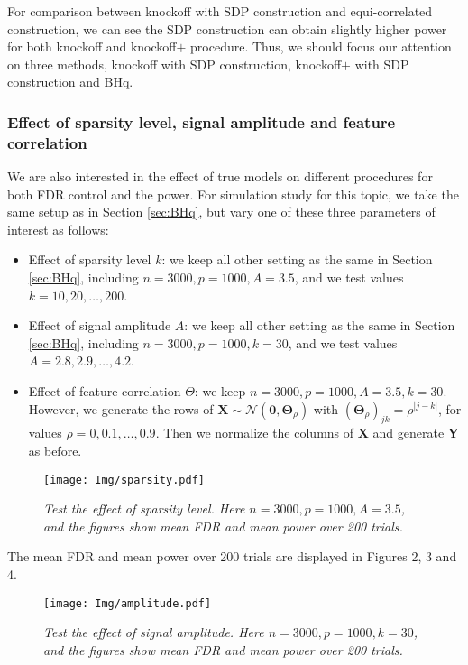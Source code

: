 \documentclass{uwstat572}
\begin{document}
For comparison between knockoff with SDP construction and equi-correlated construction, we can see the SDP construction can obtain slightly higher power for both knockoff and knockoff$+$ procedure. Thus, we should focus our attention on three methods, knockoff with SDP construction, knockoff$+$ with SDP construction and BHq.

\subsubsection{Effect of sparsity level, signal amplitude and feature correlation}\label{sec:effect}
We are also interested in the effect of true models on different procedures for both FDR control and the power. For simulation study for this topic, we take the same setup as in Section \ref{sec:BHq}, but vary one of these three parameters of interest as follows:
\begin{itemize}
\item Effect of sparsity level $k$: we keep all other setting as the same in Section \ref{sec:BHq}, including $n=3000, p=1000, A=3.5$, and we test values $k=10,20,\dots, 200$.
\item Effect of signal amplitude $A$: we keep all other setting as the same in Section \ref{sec:BHq}, including $n=3000, p=1000, k=30$, and we test values $A=2.8,2.9,\dots, 4.2$.
\item Effect of feature correlation $\Theta$: we keep $n=3000, p=1000, A=3.5, k=30$. However, we generate the rows of $\bm{X} \sim \mathcal{N}(\bm{0}, \bm{\Theta}_\rho)$ with $(\bm{\Theta}_\rho)_{jk} = \rho^{|j-k|}$, for values $\rho = 0,0.1,\dots, 0.9$. Then we normalize the columns of $\bm{X}$ and generate $\bm{Y}$ as before. 
\end{itemize}

\begin{figure}\label{Fig:2}
	\centering\texttt{[image: Img/sparsity.pdf]}
	\caption{{\it Test the effect of sparsity level. Here $n=3000, p=1000, A=3.5$, and the figures show mean FDR and mean power over 200 trials.}}
\end{figure}  

The mean FDR and mean power over 200 trials are displayed in Figures 2, 3 and 4. 


\begin{figure}\label{Fig:3}
	\centering\texttt{[image: Img/amplitude.pdf]}
	\caption{{\it Test the effect of signal amplitude. Here $n=3000, p=1000, k = 30$, and the figures show mean FDR and mean power over 200 trials.}}
\end{figure} 
\end{document}
